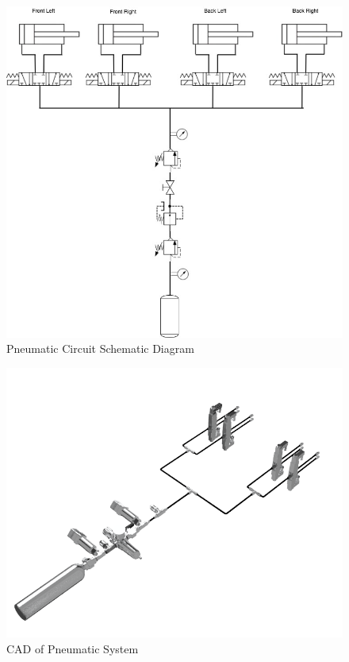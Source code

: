 \documentclass[main.tex]{subfiles}
\begin{document}
	\begin{figure}
        \centering
        \includegraphics[width=\linewidth] {images/Pneumatic_Circuit}
        \caption{Pneumatic Circuit Schematic Diagram}
        \label{fig:pneumatic-diagram}
    \end{figure}

	\begin{figure}
        \centering
        \includegraphics[width=\linewidth] {images/pneumatic_system}
        \caption{CAD of Pneumatic System}
        \label{fig:pneumatic-cad}
    \end{figure}
\end{document}
